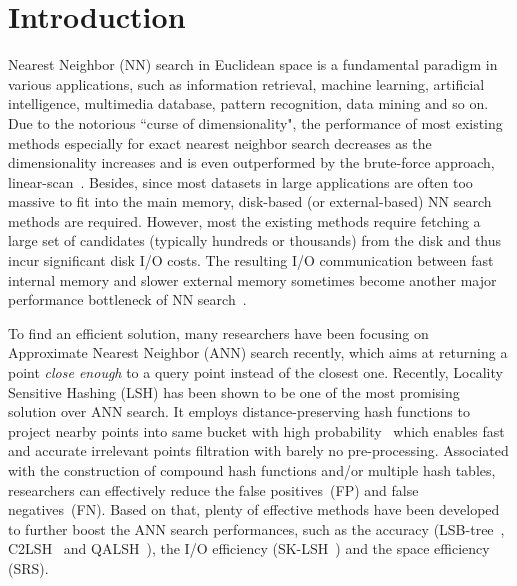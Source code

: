 \documentclass[twocolumn]{svjour3}          %
\begin{document}
\section{Introduction}\label{sec:introduction}
Nearest Neighbor (NN) search in Euclidean space is a fundamental paradigm in various applications, such as information retrieval, machine learning, artificial intelligence, multimedia database, pattern recognition, data mining and so on. 
Due to the notorious ``curse of dimensionality", the performance of most existing methods 
especially for exact nearest neighbor search decreases as the dimensionality increases and is even outperformed by the brute-force approach, linear-scan~\cite{Bohm2000,Weber1998}. 
Besides, since most datasets in large applications are often too massive to fit into the main memory, disk-based (or external-based) NN search methods are required. However, most the existing methods require fetching a large set of candidates (typically hundreds or thousands) from the disk and thus incur significant disk I/O costs. The resulting I/O communication between fast internal memory and slower external memory sometimes become another major performance bottleneck of NN search~\cite{Vitter2008EM}.


To find an efficient solution, many researchers have been focusing on Approximate Nearest Neighbor (ANN) search recently, which aims at returning a point \emph{close enough} to a query point instead of the closest one. 
Recently, Locality Sensitive Hashing (LSH) has been shown to be one of the most promising solution over ANN search. It employs 
distance-preserving hash functions to project nearby points into same bucket with high probability~\cite{Gionis1999,Indyk1998LSH} which enables fast and accurate irrelevant points filtration with barely no pre-processing. Associated with the construction of compound hash functions and/or multiple hash tables, researchers can effectively reduce the false positives~(FP) and false negatives~(FN). Based on that, plenty of effective methods have been developed to further boost the ANN search performances, such as the accuracy (LSB-tree~\cite{Tao2009LSB}, C2LSH~\cite{Gan2012C2LSH} and QALSH~\cite{Huang2015QALSH}), the I/O efficiency (SK-LSH~\cite{Liu2014SKLSH}) and the space efficiency (SRS\cite{Sun2014SRS}).
\end{document}
